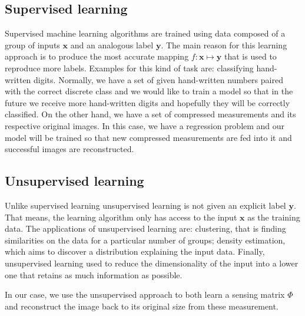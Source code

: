 \subsection{Supervised learning} \label{sec:superv}
Supervised machine learning algorithms are trained using data composed of a group of inputs $\mathbf{x}$ and an analogous label $\mathbf{y}$. The main reason for this learning approach is to produce the most accurate mapping $f : \mathbf{x} \mapsto \mathbf{y} $ that is used to reproduce more labels. Examples for this kind of task are: classifying hand-written digits. Normally, we have a set of given hand-written numbers paired with the correct discrete class and we would like to train a model so that in the future we receive more hand-written digits and hopefully they will be correctly classified. On the other hand, we have a set of compressed measurements and its respective original images. In this case, we have a regression problem and our model will be trained so that new compressed measurements are fed into it and successful images are reconstructed.  

\FloatBarrier 

\subsection{Unsupervised learning} \label{sec:unsuperv}
Unlike supervised learning unsupervised learning is not given an explicit label $\mathbf{y}$. That means, the learning algorithm only has access to the input  $\mathbf{x}$ as the training data. The applications of unsupervised learning are: clustering, that is finding similarities on the data for a particular number of groups; density estimation, which aims to discover a distribution explaining the input data. Finally, unsupervised learning used to reduce the dimensionality of the input into a lower one that retains as much information as possible. \

In our case, we use the unsupervised approach to both learn a sensing matrix $\Phi$ and  reconstruct the image back to its original size from these measurement. 

\FloatBarrier
        
